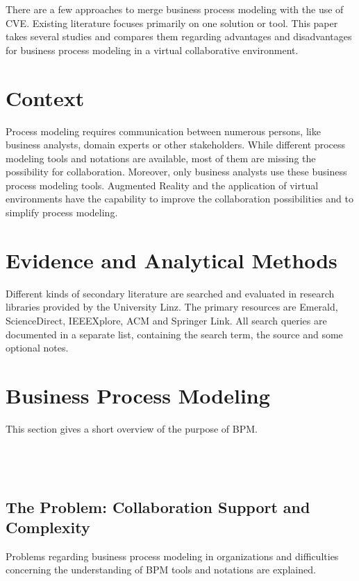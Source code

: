 There are a few approaches to merge business process modeling with the use of CVE. Existing literature focuses primarily on one
solution or tool. This paper takes several studies and compares them regarding advantages and disadvantages for business process 
modeling in a virtual collaborative environment.

\section{Context}

Process modeling requires communication between numerous persons, like business analysts, domain experts or other stakeholders. 
While different process modeling tools and notations are available, most of them are missing the possibility for collaboration. 
Moreover, only business analysts use these business process modeling tools. Augmented Reality and the application of virtual 
environments have the capability to improve the collaboration possibilities and 
to simplify process modeling. 

\section{Evidence and Analytical Methods} 

Different kinds of secondary literature are searched and evaluated in research libraries provided by the University Linz. 
The primary resources are Emerald, ScienceDirect, IEEEXplore, ACM and Springer Link. All search queries are documented in a 
separate list, containing the search term, the source and some optional notes.

\section{Business Process Modeling}

This section gives a short overview of the purpose of BPM.\\
\cite{Davenport1993}\\
\cite{Gou2000}\\
\cite{Loos2008}\\
\cite{Aalst2000}

	\subsection{The Problem: Collaboration Support and Complexity}
	Problems regarding business process modeling in organizations and difficulties concerning the understanding of BPM tools and notations are explained.\\
	\cite{Cognini2013} \\
	\cite{Backer2009}\\
	\cite{Hahn2010}\\
	\cite{Nolte2011}\\
	\cite{Polancic2013}
	
